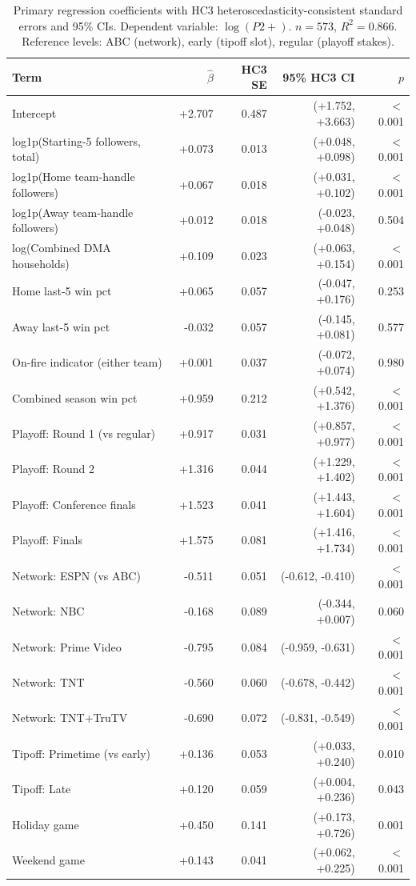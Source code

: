 \begin{table}[ht]
\centering
\caption{Primary regression coefficients with HC3 heteroscedasticity-consistent standard errors and 95\% CIs. Dependent variable: $\log(P2+)$. $n=573$, $R^2 = 0.866$. Reference levels: ABC (network), early (tipoff slot), regular (playoff stakes).} 
\label{tab:regression}
\begin{tabular}{lrrrr}
  \toprule
Term & $\hat{\beta}$ & HC3 SE & 95\% HC3 CI & $p$ \\ 
  \midrule
Intercept & +2.707 & 0.487 & (+1.752, +3.663) & $<$0.001 \\ 
  log1p(Starting-5 followers, total) & +0.073 & 0.013 & (+0.048, +0.098) & $<$0.001 \\ 
  log1p(Home team-handle followers) & +0.067 & 0.018 & (+0.031, +0.102) & $<$0.001 \\ 
  log1p(Away team-handle followers) & +0.012 & 0.018 & (-0.023, +0.048) & 0.504 \\ 
  log(Combined DMA households) & +0.109 & 0.023 & (+0.063, +0.154) & $<$0.001 \\ 
  Home last-5 win pct & +0.065 & 0.057 & (-0.047, +0.176) & 0.253 \\ 
  Away last-5 win pct & -0.032 & 0.057 & (-0.145, +0.081) & 0.577 \\ 
  On-fire indicator (either team) & +0.001 & 0.037 & (-0.072, +0.074) & 0.980 \\ 
  Combined season win pct & +0.959 & 0.212 & (+0.542, +1.376) & $<$0.001 \\ 
  Playoff: Round 1 (vs regular) & +0.917 & 0.031 & (+0.857, +0.977) & $<$0.001 \\ 
  Playoff: Round 2 & +1.316 & 0.044 & (+1.229, +1.402) & $<$0.001 \\ 
  Playoff: Conference finals & +1.523 & 0.041 & (+1.443, +1.604) & $<$0.001 \\ 
  Playoff: Finals & +1.575 & 0.081 & (+1.416, +1.734) & $<$0.001 \\ 
  Network: ESPN (vs ABC) & -0.511 & 0.051 & (-0.612, -0.410) & $<$0.001 \\ 
  Network: NBC & -0.168 & 0.089 & (-0.344, +0.007) & 0.060 \\ 
  Network: Prime Video & -0.795 & 0.084 & (-0.959, -0.631) & $<$0.001 \\ 
  Network: TNT & -0.560 & 0.060 & (-0.678, -0.442) & $<$0.001 \\ 
  Network: TNT+TruTV & -0.690 & 0.072 & (-0.831, -0.549) & $<$0.001 \\ 
  Tipoff: Primetime (vs early) & +0.136 & 0.053 & (+0.033, +0.240) & 0.010 \\ 
  Tipoff: Late & +0.120 & 0.059 & (+0.004, +0.236) & 0.043 \\ 
  Holiday game & +0.450 & 0.141 & (+0.173, +0.726) & 0.001 \\ 
  Weekend game & +0.143 & 0.041 & (+0.062, +0.225) & $<$0.001 \\ 
   \bottomrule
\end{tabular}
\end{table}

